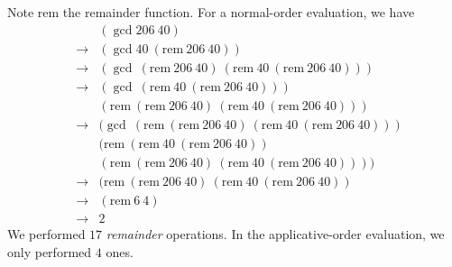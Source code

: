 \documentclass[a4paper,12pt]{article}
\newcommand{\ra}{\rightarrow}
\begin{document}
 Note \textrm{rem} the remainder function.
For a normal-order evaluation, we have
\begin{eqnarray*}
&&(\gcd 206\ 40)  \\ 
&\ra& (\gcd 40\ (\mathrm{rem}\ 206\ 40)) \\
&\ra& (\gcd\ (\mathrm{rem}\ 206\ 40)\ 
(\mathrm{rem}\ 40\ (\mathrm{rem}\ 206\ 40))) \\
&\ra& (\gcd\ (\mathrm{rem}\ 40\ (\mathrm{rem}\ 206\ 40))) \\
&&(\mathrm{rem}\ (\mathrm{rem}\ 206\ 40)\ 
(\mathrm{rem}\ 40\ (\mathrm{rem}\ 206\ 40))) \\
&\ra&(\gcd\ (\mathrm{rem}\ (\mathrm{rem}\ 206\ 40)\ 
(\mathrm{rem}\ 40\ (\mathrm{rem}\ 206\ 40)))\\
&&(\mathrm{rem}\ (\mathrm{rem}\ 40\ (\mathrm{rem}\ 206\ 40))\\
&&(\mathrm{rem}\ (\mathrm{rem}\ 206\ 40)\ 
(\mathrm{rem}\ 40\ (\mathrm{rem}\ 206\ 40)))) \\
&\ra& (\mathrm{rem}\ (\mathrm{rem}\ 206\ 40)\ 
(\mathrm{rem}\ 40\ (\mathrm{rem}\ 206\ 40)) \\
&\ra& (\mathrm{rem}\ 6\ 4)\\
&\ra& 2
\end{eqnarray*}
We performed $17$ \emph{remainder} operations.  In the
applicative-order evaluation, we only performed $4$ ones.
\end{document}
